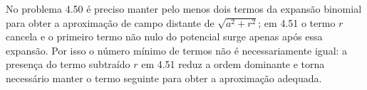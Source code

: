 No problema 4.50 é preciso manter pelo menos dois termos da expansão binomial para obter a aproximação de campo distante de $\sqrt{a^{2}+r^{2}}$; em 4.51 o termo $r$ cancela e o primeiro termo não nulo do potencial surge apenas após essa expansão. Por isso o número mínimo de termos não é necessariamente igual: a presença do termo subtraído $r$ em 4.51 reduz a ordem dominante e torna necessário manter o termo seguinte para obter a aproximação adequada. 